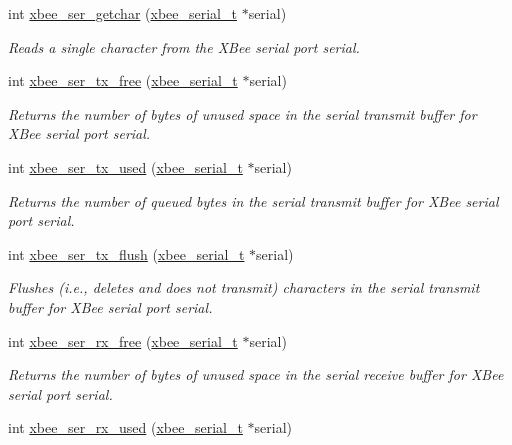 \begin{DoxyCompactItemize}
int \hyperlink{group__hal__dos_gaeeb38154313a44f86146cdcfe08e7d08}{xbee\+\_\+ser\+\_\+getchar} (\hyperlink{structxbee__serial__t}{xbee\+\_\+serial\+\_\+t} $\ast$serial)
\begin{DoxyCompactList}\small\item\em Reads a single character from the X\+Bee serial port {\itshape serial}. \end{DoxyCompactList}\item 
int \hyperlink{group__hal__dos_ga3ad8f378b572d6fec982f1086bd3b94f}{xbee\+\_\+ser\+\_\+tx\+\_\+free} (\hyperlink{structxbee__serial__t}{xbee\+\_\+serial\+\_\+t} $\ast$serial)
\begin{DoxyCompactList}\small\item\em Returns the number of bytes of unused space in the serial transmit buffer for X\+Bee serial port {\itshape serial}. \end{DoxyCompactList}\item 
int \hyperlink{group__hal__dos_gaabf70934d186354cde4ac14ed27d1bd2}{xbee\+\_\+ser\+\_\+tx\+\_\+used} (\hyperlink{structxbee__serial__t}{xbee\+\_\+serial\+\_\+t} $\ast$serial)
\begin{DoxyCompactList}\small\item\em Returns the number of queued bytes in the serial transmit buffer for X\+Bee serial port {\itshape serial}. \end{DoxyCompactList}\item 
int \hyperlink{group__hal__dos_ga05308d37301d27715f1e1308b7189220}{xbee\+\_\+ser\+\_\+tx\+\_\+flush} (\hyperlink{structxbee__serial__t}{xbee\+\_\+serial\+\_\+t} $\ast$serial)
\begin{DoxyCompactList}\small\item\em Flushes (i.\+e., deletes and does not transmit) characters in the serial transmit buffer for X\+Bee serial port {\itshape serial}. \end{DoxyCompactList}\item 
int \hyperlink{group__hal__dos_ga16fb431a1e66861439518e562431821f}{xbee\+\_\+ser\+\_\+rx\+\_\+free} (\hyperlink{structxbee__serial__t}{xbee\+\_\+serial\+\_\+t} $\ast$serial)
\begin{DoxyCompactList}\small\item\em Returns the number of bytes of unused space in the serial receive buffer for X\+Bee serial port {\itshape serial}. \end{DoxyCompactList}\item 
int \hyperlink{group__hal__dos_ga43b8322771cc16b4130fa5330ad2242b}{xbee\+\_\+ser\+\_\+rx\+\_\+used} (\hyperlink{structxbee__serial__t}{xbee\+\_\+serial\+\_\+t} $\ast$serial)

\end{DoxyCompactItemize}
